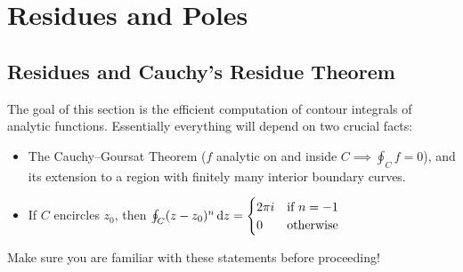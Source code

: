\graphicspath{{6residues/asy/}}

\section{Residues and Poles}

\subsection{Residues and Cauchy's Residue Theorem}

The goal of this section is the efficient computation of contour integrals of analytic functions. Essentially everything will depend on two crucial facts:
\begin{itemize}
  \item The Cauchy--Goursat Theorem ($f$ analytic on and inside $C\implies \oint_Cf=0$), and its extension to a region with finitely many interior boundary curves.
  \item If $C$ encircles $z_0$, then $\oint_C(z-z_0)^n\,{\mathrm{d} z}=\begin{cases}
  2\pi i&\text{if $n=-1$}\\
  0&\text{otherwise}
  \end{cases}$
\end{itemize}
Make sure you are familiar with these statements before proceeding!


